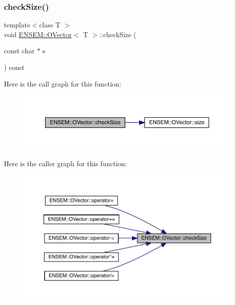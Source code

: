 \subsubsection{\texorpdfstring{checkSize()}{checkSize()}\hspace{0.1cm}{\footnotesize\ttfamily [1/4]}}
{\footnotesize\ttfamily template$<$class T $>$ \\
void \mbox{\hyperlink{classENSEM_1_1OVector}{E\+N\+S\+E\+M\+::\+O\+Vector}}$<$ T $>$\+::check\+Size (\begin{DoxyParamCaption}\item[{const char $\ast$}]{s }\end{DoxyParamCaption}) const\hspace{0.3cm}{\ttfamily [inline]}}

Here is the call graph for this function\+:
\nopagebreak
\begin{figure}[H]
\begin{center}
\leavevmode
\includegraphics[width=350pt]{d0/d8d/classENSEM_1_1OVector_a12d09a71bb2808a7404578da9ba41c4f_cgraph}
\end{center}
\end{figure}
Here is the caller graph for this function\+:\nopagebreak
\begin{figure}[H]
\begin{center}
\leavevmode
\includegraphics[width=350pt]{d0/d8d/classENSEM_1_1OVector_a12d09a71bb2808a7404578da9ba41c4f_icgraph}
\end{center}
\end{figure}
\mbox{\label{classENSEM_1_1OVector_a12d09a71bb2808a7404578da9ba41c4f}} 
